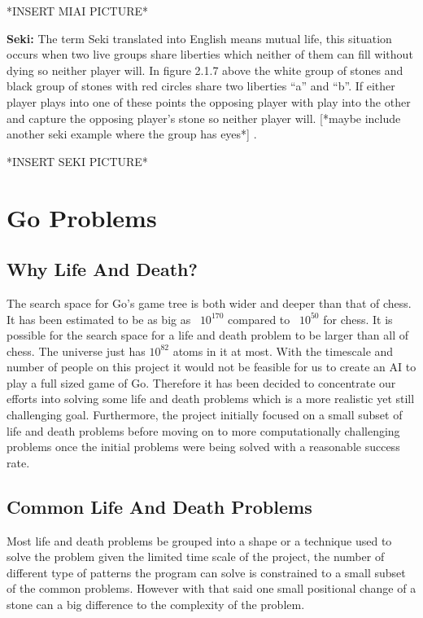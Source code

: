 \documentclass{l3proj}
\begin{document}
*INSERT MIAI PICTURE*

\textbf{Seki:} The term Seki translated into English means mutual life, this situation occurs when two live groups share liberties which neither of them can fill without dying so neither player will.
 In figure 2.1.7 above the white group of stones and black group of stones with red circles share two liberties “a” and “b”. If either player plays into one of these points the opposing player with play into the other and capture the opposing player’s stone so neither player will. [*maybe include another seki example where the group has eyes*] .

*INSERT SEKI PICTURE*

\section{Go Problems}

\subsection{Why Life And Death?}

The search space for Go's game tree is both wider and deeper than that of chess. It has been estimated to be as big as ~$10^{170}$ compared to ~$10^{50}$ for chess. It is possible for the search space for a life and death problem to be larger than all of chess. The universe just has $10^{82}$ atoms in it at most. With the timescale and number of people on this project it would not be feasible for us to create an AI to play a full sized game of Go. Therefore it has been decided to concentrate our efforts into solving some life and death problems which is a more realistic yet still challenging goal. Furthermore, the project initially focused on a small subset of life and death problems before moving on to more computationally challenging problems once the initial problems were being solved with a reasonable success rate.

\subsection{Common Life And Death Problems}

Most life and death problems be grouped into a shape or a technique used to solve the problem given the limited time scale of the project, the number of different type of patterns the program can solve is constrained to a small subset of the common problems. However with that said one small positional change of a stone can a big difference to the complexity of the problem.
\end{document}
